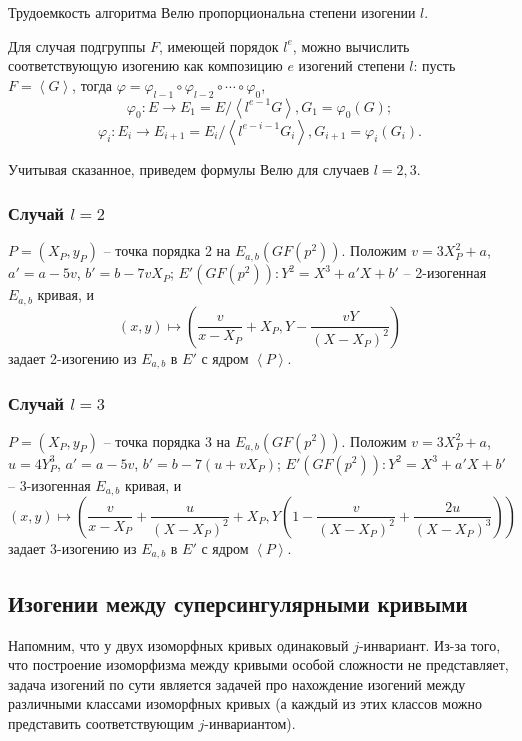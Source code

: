 \documentclass[a4paper,12pt]{article}
\newcommand{\tr}[1]{\left\langle #1\right\rangle}
\theoremstyle{definition}
\begin{document}
  Трудоемкость алгоритма Велю пропорциональна степени изогении $l$.
  
Для случая подгруппы $F$, имеющей порядок $l^e$, можно вычислить соответствующую изогению как композицию $e$ изогений степени $l$:
пусть $F=\tr{G}$, тогда $\varphi=\varphi_{l-1}\circ\varphi_{l-2}\circ\cdots\circ \varphi_0$, 
$$\varphi_0:E\to E_1=E/\tr{l^{e-1}G}, G_1=\varphi_0(G);$$
$$\varphi_i:E_i\to E_{i+1}=E_i/\tr{l^{e-i-1}G_i}, G_{i+1}=\varphi_i(G_i). $$
  
Учитывая сказанное, приведем формулы Велю для случаев $l=2,3$.

 \subsubsection*{Случай $l=2$}
  $P=(X_P,y_P)$ -- точка порядка 2 на $E_{a,b}(GF(p^2))$. Положим $v=3X_P^2+a$, $a'=a-5v$, $b'=b-7vX_P$;
 $E'(GF(p^2)): Y^2=X^3+a'X+b'$ -- 2-изогенная $E_{a,b}$ кривая, и
 $$
 (x,y)\mapsto \left(\frac{v}{x-X_P}+X_P, Y-\frac{vY}{(X-X_P)^2}\right) 
 $$
 задает 2-изогению из $E_{a,b}$ в $E'$ с ядром $\tr{P}$. 

   
 \subsubsection*{Случай $l=3$}
  $P=(X_P,y_P)$ -- точка порядка 3 на $E_{a,b}(GF(p^2))$. Положим $v=3X_P^2+a$, $u=4Y_P^3$, $a'=a-5v$, $b'=b-7(u+vX_P)$;
 $E'(GF(p^2)): Y^2=X^3+a'X+b'$ -- 3-изогенная $E_{a,b}$ кривая, и
 $$
 (x,y)\mapsto \left(\frac{v}{x-X_P}+\frac{u}{(X-X_P)^2}+X_P, Y\left(1-\frac{v}{(X-X_P)^2}+\frac{2u}{(X-X_P)^3}\right)\right) 
 $$
 задает 3-изогению из $E_{a,b}$ в $E'$ с ядром $\tr{P}$. 

  
  
\subsection{Изогении между суперсингулярными кривыми}

Напомним, что у двух изоморфных кривых одинаковый $j$-инвариант.
Из-за того, что построение изоморфизма между кривыми особой сложности не представляет, 
задача  изогений по сути является задачей про нахождение изогений между различными классами изоморфных кривых (а каждый из этих классов можно представить  соответствующим $j$-инвариантом).

\end{document}
